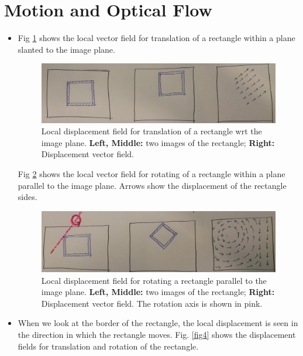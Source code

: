 \documentclass[11pt]{article}
\begin{document}
\section{Motion and Optical Flow}
\vspace{-10pt}

\begin{itemize}
\item Fig \ref{fig2} shows the local vector field for translation of a rectangle within a plane  slanted to the image plane. 

\begin{figure}[!hbt]
\centering
  \includegraphics[width=\linewidth]{../rect.jpg}
 \caption{Local displacement field for translation of a rectangle wrt the image plane. {\bf Left, Middle:} two images of the rectangle; {\bf Right:} Displacement vector field.}
 \label{fig2}
\end{figure}

Fig \ref{fig3} shows the local vector field for rotating of a rectangle within a plane  parallel to the image plane. Arrows show the displacement of the rectangle sides.

\begin{figure}[!hbt]
\centering
  \includegraphics[width=\linewidth]{../rect2.jpg}
 \caption{Local displacement field for rotating  a rectangle parallel to the image plane. {\bf Left, Middle:} two images of the rectangle; {\bf Right:} Displacement vector field. The rotation axis is shown in pink.}
 \label{fig3}
\end{figure}

\item When we look at the border of the rectangle, the local displacement is seen in the direction in which the rectangle moves. Fig. \ref{fig4} shows the displacement fields for translation and rotation of the rectangle.


\end{itemize}
\end{document}
